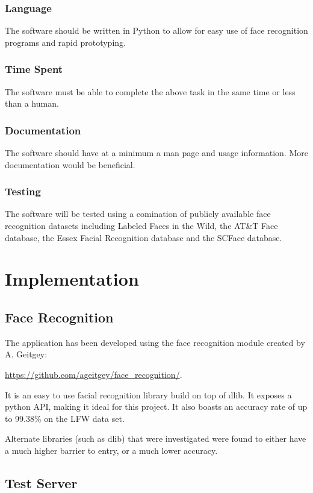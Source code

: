 \documentclass[12pt]{article}
\begin{document}
\subsubsection{Language}
The software should be written in Python to allow for easy use of face recognition programs and rapid prototyping.

\subsubsection{Time Spent}
The software must be able to complete the above task in the same time or less than a human.

\subsubsection{Documentation}
The software should have at a minimum a man page and usage information. More documentation would be beneficial.

\subsubsection{Testing}
The software will be tested using a comination of publicly available face recognition datasets including Labeled Faces in the Wild, the AT\&T Face database, the Essex Facial Recognition database and the SCFace database. 

\newpage
\section{Implementation}
\subsection{Face Recognition}
The application has been developed using the face recognition module created by A. Geitgey:

\url{https://github.com/ageitgey/face\_recognition/}.

It is an easy to use facial recognition library build on top of dlib. It exposes a python API, making it ideal for this project. It also boasts an accuracy rate of up to 99.38\% on the LFW data set.

Alternate libraries (such as dlib) that were investigated were found to either have a much higher barrier to entry, or a much lower accuracy.

\subsection{Test Server}
\end{document}
